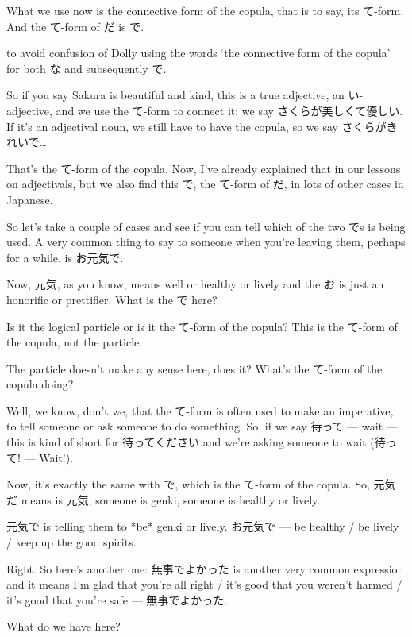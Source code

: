 What we use now is the connective form of the copula, that is to say, its て-form. And the て-form of だ is で.

to avoid confusion of Dolly using the words ‘the connective form of the copula' for both な and subsequently で.

{}

So if you say Sakura is beautiful and kind, this is a true adjective, an い-adjective, and we use the て-form to connect it: we say さくらが美しくて優しい. If it's an adjectival noun, we still have to have the copula, so we say さくらがきれいで\ldots{}

That's the て-form of the copula. Now, I've already explained that in our lessons on adjectivals, but we also find this で, the て-form of だ, in lots of other cases in Japanese.

So let's take a couple of cases and see if you can tell which of the two でs is being used. A very common thing to say to someone when you're leaving them, perhaps for a while, is お元気で.

Now, 元気, as you know, means well or healthy or lively and the お is just an honorific or prettifier. What is the で here?

Is it the logical particle or is it the て-form of the copula? This is the て-form of the copula, not the particle.

The particle doesn't make any sense here, does it? What's the て-form of the copula doing?

Well, we know, don't we, that the て-form is often used to make an imperative, to tell someone or ask someone to do something. So, if we say 待って --- wait --- this is kind of short for 待ってください and we're asking someone to wait (待って! --- Wait!).

Now, it's exactly the same with で, which is the て-form of the copula. So, 元気だ means is 元気, someone is genki, someone is healthy or lively.

元気で is telling them to *be* genki or lively. お元気で --- be healthy / be lively / keep up the good spirits.

\startsectionlevel[title={無事/ぶじで},reference={無事ぶじで}]

Right. So here's another one: 無事でよかった is another very common expression and it means I'm glad that you're all right / it's good that you weren't harmed / it's good that you're safe --- 無事でよかった.

What do we have here?

